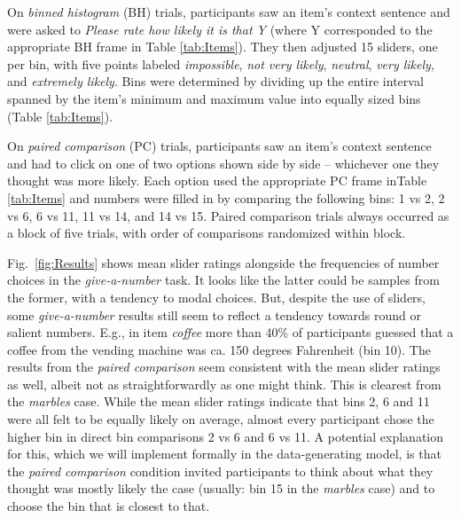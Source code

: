 \documentclass[10pt,letterpaper]{article}
\newcommand{\tableref}[1]{Table \ref{#1}}
\newcommand{\figref}[1]{Fig.~\ref{#1}}
\begin{document}
On \emph{binned histogram} (BH) trials, participants saw an item's context sentence and were
asked to \emph{Please rate how likely it is that Y} (where Y corresponded to the appropriate BH
frame in \tableref{tab:Items}). They then adjusted 15 sliders, one per bin, with five points
labeled \emph{impossible}, \emph{not very likely}, \emph{neutral}, \emph{very likely}, and
\emph{extremely likely}. Bins were determined by dividing up the entire interval spanned by the
item's minimum and maximum value into equally sized bins (\tableref{tab:Items}).



On \emph{paired comparison} (PC) trials, participants saw an item's context sentence and had to
click on one of two options shown side by side -- whichever one they thought was more likely.
Each option used the appropriate PC frame in\tableref{tab:Items} and numbers were filled in by
comparing the following bins: 1 vs 2, 2 vs 6, 6 vs 11, 11 vs 14, and 14 vs 15. Paired
comparison trials always occurred as a block of five trials, with order of comparisons
randomized within block.



\figref{fig:Results} shows mean slider ratings alongside the frequencies of number choices in the \emph{give-a-number} task. It looks like the
latter could be samples from the former, with a tendency to modal choices. But, despite the use
of sliders, some \emph{give-a-number} results still seem to reflect a tendency towards round or
salient numbers. E.g., in item \emph{coffee} more than 40\% of participants guessed that a
coffee from the vending machine was ca. 150 degrees Fahrenheit (bin 10). The results from the
\emph{paired comparison} seem consistent with the mean slider ratings as well, albeit not as
straightforwardly as one might think. This is clearest from the \emph{marbles} case. While the
mean slider ratings indicate that bins 2, 6 and 11 were all felt to be equally likely on
average, almost every participant chose the higher bin in direct bin comparisons 2 vs 6 and 6
vs 11. A potential explanation for this, which we will implement formally in the
data-generating model, is that the \emph{paired comparison} condition invited participants to think
about what they thought was mostly likely the case (usually: bin 15 in the
\emph{marbles} case) and to choose the bin that is closest to that.
\end{document}

